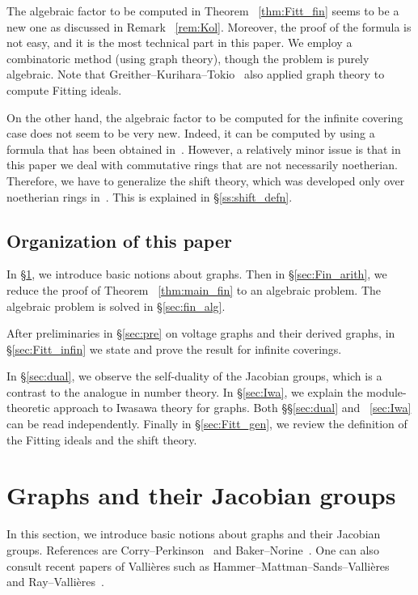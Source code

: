The algebraic factor to be computed in Theorem ~\ref{thm:Fitt_fin} seems to be a new one as discussed in Remark ~\ref{rem:Kol}.
Moreover, the proof of the formula is not easy, and it is the most technical part in this paper.
We employ a combinatoric method (using graph theory), though the problem is purely algebraic.
Note that Greither--Kurihara--Tokio~\cite{GKT20} also applied graph theory to compute Fitting ideals.

On the other hand, the algebraic factor to be computed for the infinite covering case does not seem to be very new.
Indeed, it can be computed by using a formula that has been obtained in~\cite{AK21}.
However, a relatively minor issue is that in this paper we deal with commutative rings that are not necessarily noetherian.
Therefore, we have to generalize the shift theory, which was developed only over noetherian rings in~\cite{Kata_05}.
This is explained in \S\ref{ss:shift_defn}.

\subsection{Organization of this paper}\label{ss:org}

In \S\ref{sec:defn_J_graph}, we introduce basic notions about graphs.
Then in \S\ref{sec:Fin_arith}, we reduce the proof of Theorem ~\ref{thm:main_fin} to an algebraic problem.
The algebraic problem is solved in \S\ref{sec:fin_alg}.

After preliminaries in \S\ref{sec:pre} on voltage graphs and their derived graphs, in \S\ref{sec:Fitt_infin} we state and prove the result for infinite coverings.

In \S\ref{sec:dual}, we observe the self-duality of the Jacobian groups, which is a contrast to the analogue in number theory.
In \S\ref{sec:Iwa}, we explain the module-theoretic approach to Iwasawa theory for graphs.
Both \S\S\ref{sec:dual} and ~\ref{sec:Iwa} can be read independently.
Finally in \S\ref{sec:Fitt_gen}, we review the definition of the Fitting ideals and the shift theory.

\section{Graphs and their Jacobian groups}\label{sec:defn_J_graph}

In this section, we introduce basic notions about graphs and their Jacobian groups.
References are Corry--Perkinson~\cite[Chapters 1 and 2]{CP18} and Baker--Norine~\cite[\S 1.3]{BN07}.
One can also consult recent papers of Valli\`eres such as Hammer--Mattman--Sands--Valli\`eres~\cite[\S 2]{HMSV24} and Ray--Valli\`eres~\cite[\S 2]{RV22}.

